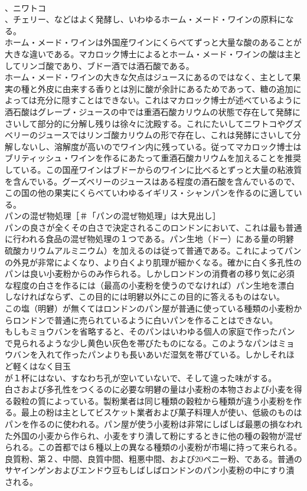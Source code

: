 \documentclass[8pt]{extreport}
\begin{document}
\begin{CJK}{UTF8}{min}
\\	、ニワトコ
\\	、チェリー、などはよく発酵し、いわゆるホーム・メード・ワインの原料になる。
\\	ホーム・メード・ワインは外国産ワインにくらべてずっと大量な酸のあることが大きな違いである。マカロック博士によるとホーム・メード・ワインの酸は主としてリンゴ酸であり、ブドー酒では酒石酸である。
\\	ホーム・メード・ワインの大きな欠点はジュースにあるのではなく、主として果実の種と外皮に由来する香りとは別に酸が余計にあるためであって、糖の追加によっては充分に隠すことはできない。これはマカロック博士が述べているように酒石酸はグレープ・ジュースの中では重酒石酸カリウムの状態で存在して発酵にさいして部分的に分解し残りは徐々に沈殿する。これにたいしてニワトコやグズベリーのジュースではリンゴ酸カリウムの形で存在し、これは発酵にさいして分解しないし、溶解度が高いのでワイン内に残っている。従ってマカロック博士はブリティッシュ・ワインを作るにあたって重酒石酸カリウムを加えることを推奨している。この国産ワインはブドーからのワインに比べるとずっと大量の粘液質を含んでいる。グーズベリーのジュースはある程度の酒石酸を含んでいるので、この国の他の果実にくらべていわゆるイギリス・シャンパンを作るのに適している。
\\	パンの混ぜ物処理［＃「パンの混ぜ物処理」は大見出し］
\\	パンの良さが全くその白さで決定されるこのロンドンにおいて、これは最も普通に行われる食品の混ぜ物処理の１つである。パン生地（ドー）にある量の明礬
\\	硫酸カリウムアルミニウム）を加えるのは従って普通である。これによってパンの外見が非常によくなり、より白くより肌理が細かくなる。確かに白く多孔性のパンは良い小麦粉からのみ作られる。しかしロンドンの消費者の移り気に必須な程度の白さを作るには（最高の小麦粉を使うのでなければ）パン生地を漂白しなければならず、この目的には明礬以外にこの目的に答えるものはない。
\\	この塩（明礬）が無くてはロンドンのパン屋が普通に使っている種類の小麦粉からロンドンで普通に売られているように白いパンを作ることはできない。
\\	もしもミョウバンを省略すると、そのパンはいわゆる個人の家庭で作ったパンで見られるような少し黄色い灰色を帯びたものになる。このようなパンはミョウバンを入れて作ったパンよりも長いあいだ湿気を帯びている。しかしそれほど軽くはなく目玉
\\	が１杯にはない、すなわち孔が空いていないで、そして違った味がする。
\\	白さおよび多孔性をつくるのに必要な明礬の量は小麦粉の本物さおよび小麦を得る穀粒の質によっている。製粉業者は同じ種類の穀粒から種類が違う小麦粉を作る。最上の粉は主としてビスケット業者および菓子料理人が使い、低級のものはパンを作るのに使われる。パン屋が使う小麦粉は非常にしばしば最悪の損なわれた外国の小麦から作られ、小麦をすり潰して粉にするときに他の種の穀物が混ぜられる。この首都では６種以上の異なる種類の小麦粉が市場に持って来られる。良質粉、第２、中間、良質中間、粗悪中間、および20ペニー粉、である。普通のサヤインゲンおよびエンドウ豆もしばしばロンドンのパン小麦粉の中にすり潰される。

\end{CJK}
\end{document}
